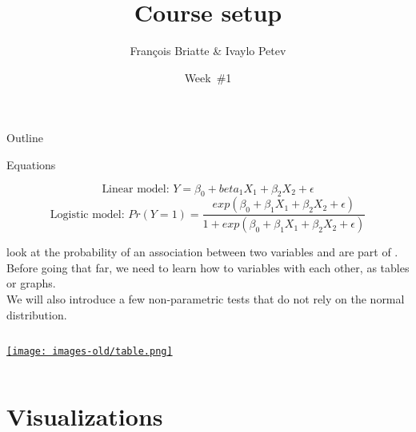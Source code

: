 \documentclass[t]{beamer}
\title{Course setup}
\author{François Briatte \& Ivaylo Petev}
\date{Week~\#1}
\begin{document}
    \frame[plain]{
		\titlepage\\[7em]
		\tableofcontents[hideallsubsections]
		}

	
	\begin{frame}[t]{Outline}
	
	\begin{block}{Equations}
	
	$$\text{Linear model:~} Y = \beta_0 + beta_1 X_1 + \beta_2 X_2 + \epsilon$$
	$$\text{Logistic model:~} Pr(Y=1) = \frac{exp(\beta_0 + \beta_1 X_1 + \beta_2 X_2 + \epsilon)}{1+exp(\beta_0 + \beta_1 X_1 + \beta_2 X_2 + \epsilon)}$$
	\end{block}
		
	 look at the probability of an association between two variables and are part of .\\[.5em]
	
	Before going that far, we need to learn how to  variables with each other, as tables or graphs.\\[.5em]
	
	We will also introduce a few non-parametric tests that do not rely on the normal distribution.\\[.5em]
	
		\begin{columns}[T]
			\tableofcontents[hideallsubsections]
			\begin{center}
				\href{http://ideas.repec.org/c/boc/bocode/s447101.html}{\texttt{[image: images-old/table.png]}}
			\end{center}		
		\end{columns}
		\vspace{2em}
	\end{frame}
		
	\section{Visualizations}
\end{document}
